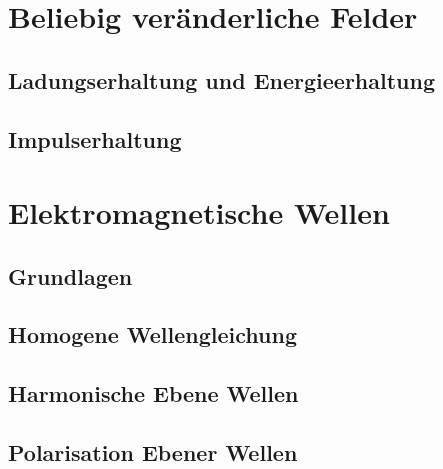 
\usepackage{pdfpages}
\usepackage{fancyhdr}
\usepackage{xcolor}



\fancyfootoffset{-1.26cm}

\section{Beliebig veränderliche Felder}
\subsection{Ladungserhaltung und Energieerhaltung}

\subsection{Impulserhaltung}

\section{Elektromagnetische Wellen}
\subsection{Grundlagen}

\subsection{Homogene Wellengleichung}

\subsection{Harmonische Ebene Wellen}

\subsection{Polarisation Ebener Wellen}

